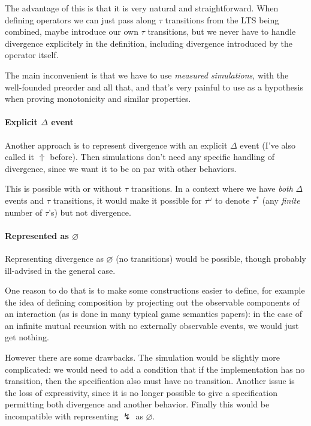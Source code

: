 \documentclass[11pt]{article}
\begin{document}
The advantage of this is that it is very natural and straightforward.
When defining operators we can just pass along $\tau$ transitions from
the LTS being combined,
maybe introduce our own $\tau$ transitions,
but we never have to handle divergence explicitely
in the definition,
including divergence introduced by the operator itself.

The main inconvenient is that we have to use \emph{measured simulations},
with the well-founded preorder and all that,
and that's very painful to use as a hypothesis
when proving monotonicity and similar properties.

\paragraph{Explicit $\Delta$ event}

Another approach is to represent divergence
with an explicit $\Delta$ event (I've also called it $\Uparrow$ before).
Then simulations don't need any specific handling of divergence,
since we want it to be on par with other behaviors.

This is possible with or without $\tau$ transitions.
In a context where we have \emph{both} $\Delta$ events and $\tau$ transitions,
it would make it possible for $\tau^\omega$ to denote $\tau^*$
(any \emph{finite} number of $\tau$'s)
but not divergence.

\paragraph{Represented as $\varnothing$}

Representing divergence as $\varnothing$ (no transitions)
would be possible, though probably ill-advised in the general case.

One reason to do that is
to make some constructions easier to define,
for example the idea of defining composition
by projecting out the observable components of an interaction
(as is done in many typical game semantics papers):
in the case of an infinite mutual recursion with no
externally observable events,
we would just get nothing.

However there are some drawbacks.
The simulation would be slightly more complicated:
we would need to add a condition that
if the implementation has no transition,
then the specification also must have no transition.
Another issue is the loss of expressivity,
since it is no longer possible to give a specification
permitting both divergence and another behavior.
Finally this would be incompatible with
representing $\lightning$ as $\varnothing$.
\end{document}
